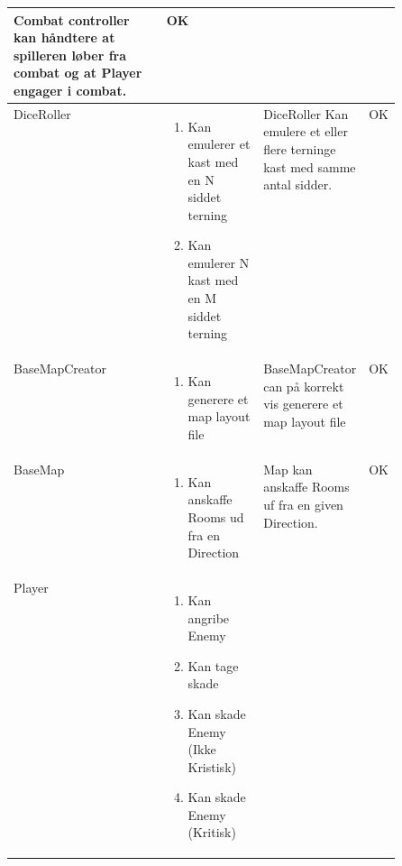 \begin{center}
\begin{longtable}{|l|p{0.25\linewidth}|p{0.25\linewidth}|l|}
  Combat controller kan håndtere at spilleren løber fra combat og at Player engager i combat.
  &
  OK
  \\ \hline
  DiceRoller
  &
  \begin{enumerate}
    \item \begin{flushleft} Kan emulerer et kast med en N siddet terning \end{flushleft}
    \item \begin{flushleft} Kan emulerer N kast med en M siddet terning \end{flushleft}
  \end{enumerate}
  &
  \flushleft
  DiceRoller Kan emulere et eller flere terninge kast med samme antal sidder.
  &
  OK
  \\ \hline
  BaseMapCreator
  &
  \begin{enumerate}
    \item \begin{flushleft} Kan generere et map layout file \end{flushleft}
  \end{enumerate}
  &
  \flushleft
  BaseMapCreator can på korrekt vis generere et map layout file
  &
  OK
  \\ \hline
  BaseMap
  &
  \begin{enumerate}
    \item \begin{flushleft} Kan anskaffe Rooms ud fra en Direction \end{flushleft}
  \end{enumerate}
  &
  \flushleft
  Map kan anskaffe Rooms uf fra en given Direction.
  &
  OK
  \\ \hline
  Player
  &
  \begin{enumerate}
    \item \begin{flushleft} Kan angribe Enemy  \end{flushleft}
    \item \begin{flushleft} Kan tage skade \end{flushleft}
    \item \begin{flushleft} Kan skade Enemy (Ikke Kristisk)  \end{flushleft}
    \item \begin{flushleft} Kan skade Enemy (Kritisk)  \end{flushleft}

\end{enumerate}
\end{longtable}
\end{center}
